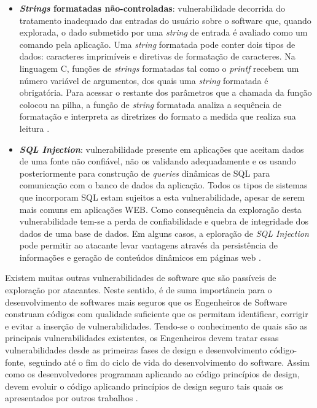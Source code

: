 \begin{itemize}
\item \textbf{\emph{Strings} formatadas não-controladas}: vulnerabilidade decorrida do tratamento inadequado das entradas do usuário sobre o software que, quando explorada, o dado submetido por uma \emph{string} de entrada é avaliado como um comando pela aplicação. Uma \emph{string} formatada pode conter dois tipos de dados: caracteres imprimíveis e diretivas de formatação de caracteres. Na linguagem C, funções de \emph{strings} formatadas tal como o \emph{printf} recebem um número variável de argumentos, dos quais uma \emph{string}  formatada é obrigatória. Para acessar o restante dos parâmetros que a chamada da função colocou na pilha, a função de \emph{string} formatada analiza a sequência de formatação e interpreta as diretrizes do formato a medida que realiza sua leitura \cite{lhee2002}.
\item \textbf{\emph{SQL Injection}}: vulnerabilidade presente em aplicações que aceitam dados de uma fonte não confiável, não os validando adequadamente e os usando posteriormente para construção de \emph{queries} dinâmicas de SQL para comunicação com o banco de dados da aplicação. Todos os tipos de sistemas que incorporam SQL estam sujeitos a esta vulnerabilidade, apesar de serem mais comuns em aplicações WEB. Como consequência da exploração desta vulnerabilidade tem-se a perda de confiabilidade e quebra de integridade dos dados de uma base de dados. Em alguns casos, a eploração de \emph{SQL Injection} pode permitir ao atacante levar vantagens através da persistência de informações e geração de conteúdos dinâmicos em páginas web \cite{uscert2012}.
\end{itemize}


Existem muitas outras vulnerabilidades de software que são passíveis de exploração por atacantes. Neste sentido, é de suma importância para o desenvolvimento de softwares mais seguros que os Engenheiros de Software construam códigos com qualidade suficiente que os permitam identificar, corrigir e evitar a inserção de vulnerabilidades. Tendo-se o conhecimento de quais são as principais vulnerabilidades existentes, os Engenheiros devem tratar essas vulnerabilidades desde as primeiras fases de design e desenvolvimento código-fonte, seguindo até o fim do ciclo de vida do desenvolvimento do software. Assim como os desenvolvedores programam aplicando ao código princípios de design, devem evoluir o código aplicando princípios de design seguro tais quais os apresentados por outros trabalhos \cite{saltzer1975} \cite{bishop2003} \cite{mcgraw2002} \cite{a1lshammari2009}.

